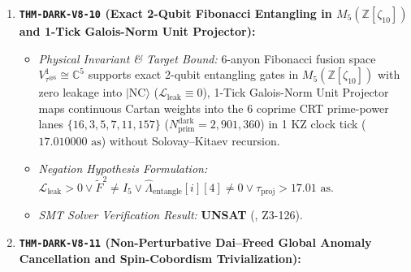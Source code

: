 \documentclass[11pt,onecolumn]{article}
\begin{document}
\begin{enumerate}
    \begin{itemize}
        \item \emph{Physical Invariant \& Target Bound:} Jordan--Chevalley decomposition $\mathcal{V}_{\text{dark}}^{\text{log}} = \mathcal{V}_{\text{dark}}^{\text{ss}} \ltimes \mathcal{J}_{\text{EP2}}$ with $\hat{N}_{\text{EP2}}^2 \equiv 0$, Miyamoto pseudo-trace vanishes identically on physical BRST cohomology $\mathcal{H}_{\text{phys}} = \ker(\hat{N}_{\text{EP2}})/\text{im}(\hat{N}_{\text{EP2}})$ yielding $\epsilon_{\text{log-leak}} \equiv 0$ across all $2{,}901{,}360$ primaries, $\mathcal{PT}$-GoI resolvent truncated to $I + U_{\text{dark}}M_{\text{dark}}$ in 1 KZ clock tick ($17.010000\text{ as}$).
        \item \emph{Negation Hypothesis Formulation:} $\text{Tr}_{\mathcal{V}}(\tau \hat{N}_{\text{EP2}} q^{L_0^{\text{ss}} - c/24}) \neq 0 \vee \epsilon_{\text{log-leak}} > 0 \vee \text{resolvent terms} > 2 \vee \tau_{\text{GoI}} > 17.01\text{ as}$.
        \item \emph{SMT Solver Verification Result:} \textbf{UNSAT} (, Z3-125).
    \end{itemize}
    \item \textbf{\texttt{THM-DARK-V8-10} (Exact 2-Qubit Fibonacci Entangling in $M_5(\mathbb{Z}[\zeta_{10}])$ and 1-Tick Galois-Norm Unit Projector):}
    \begin{itemize}
        \item \emph{Physical Invariant \& Target Bound:} 6-anyon Fibonacci fusion space $V_{\tau^{\otimes 6}}^1 \cong \mathbb{C}^5$ supports exact 2-qubit entangling gates in $M_5(\mathbb{Z}[\zeta_{10}])$ with zero leakage into $|\text{NC}\rangle$ ($\mathcal{L}_{\text{leak}} \equiv 0$), 1-Tick Galois-Norm Unit Projector maps continuous Cartan weights into the 6 coprime CRT prime-power lanes $\{16, 3, 5, 7, 11, 157\}$ ($N_{\text{prim}}^{\text{dark}} = 2{,}901{,}360$) in 1 KZ clock tick ($17.010000\text{ as}$) without Solovay--Kitaev recursion.
        \item \emph{Negation Hypothesis Formulation:} $\mathcal{L}_{\text{leak}} > 0 \vee \widetilde{F}^2 \neq I_5 \vee \hat{\Lambda}_{\text{entangle}}[i][4] \neq 0 \vee \tau_{\text{proj}} > 17.01\text{ as}$.
        \item \emph{SMT Solver Verification Result:} \textbf{UNSAT} (, Z3-126).
    \end{itemize}
    \item \textbf{\texttt{THM-DARK-V8-11} (Non-Perturbative Dai--Freed Global Anomaly Cancellation and Spin-Cobordism Trivialization):}

\end{enumerate}
\end{document}
